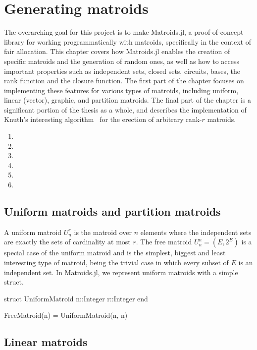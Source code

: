 \chapter{Generating matroids}
\label{chap:generating_matroids}
The overarching goal for this project is to make Matroids.jl, a proof-of-concept library for working programmatically with matroids, specifically in the context of fair allocation. This chapter covers how Matroids.jl enables the creation of specific matroids and the generation of random ones, as well as how to access important properties such as independent sets, closed sets, circuits, bases, the rank function and the closure function. The first part of the chapter focuses on implementing these features for various types of matroids, including uniform, linear (vector), graphic, and partition matroids. The final part of the chapter is a significant portion of the thesis as a whole, and describes the implementation of Knuth's interesting algorithm~\cite{knuth-1975} for the erection of arbitrary rank-$r$ matroids.

\begin{enumerate}
  \item {}
  \item {}
  \item {}
  \item {}
  \item {}
  \item {}
\end{enumerate}


\section{Uniform matroids and partition matroids}
A uniform matroid $U_n^r$ is the matroid over $n$ elements where the independent sets are exactly the sets of cardinality at most $r$. The free matroid $U_n^n = (E, 2^E)$ is a special case of the uniform matroid and is the simplest, biggest and least interesting type of matroid, being the trivial case in which every subset of $E$ is an independent set. In Matroids.jl, we represent uniform matroids with a simple struct.

\begin{jllisting}
struct UniformMatroid
  n::Integer
  r::Integer
end

FreeMatroid(n) = UniformMatroid(n, n)
\end{jllisting}


\section{Linear matroids}

